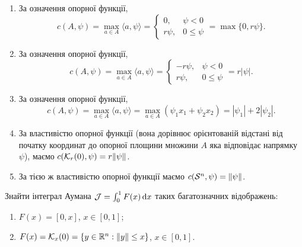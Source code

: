 \begin{solution}
	\begin{enumerate}
		\item За означення опорної функції, \[ c(A, \psi) = \max_{a \in A} \langle a, \psi \rangle = \begin{cases} 0, & \psi < 0 \\ r \psi, & 0 \le \psi \end{cases} = \max \{ 0, r \psi \}. \]

		\item За означення опорної функції, \[ c(A, \psi) = \max_{a \in A} \langle a, \psi \rangle = \begin{cases} - r \psi, & \psi < 0 \\ r \psi, & 0 \le \psi \end{cases} = r |\psi |. \]

		\item За означення опорної функції, \[ c(A, \psi) = \max_{a \in A} \langle a, \psi \rangle = \max_{a \in A} (\psi_1 x_1 + \psi_2 x_2) = |\psi_1| + 2 |\psi_2|. \]

		\item За властивістю опорної функції (вона дорівнює орієнтованій відстані від початку координат до опорної площини множини $A$ яка відповідає напрямку $\psi$), маємо $c(\mathcal{K}_r (0), \psi) = r \| \psi \|$.

		\item За тією ж властивістю опорної функції маємо $c(\mathcal{S}^n, \psi) = \| \psi \|$.
	\end{enumerate}
\end{solution}

\begin{problem}
	Знайти інтеграл Аумана $\mathcal{J} = \int_0^1 F(x) \mathop{}\!\mathrm{d} x$ таких багатозначних відображень:

	\begin{enumerate}
		\item $F(x) = [0, x]$, $x \in [0, 1]$;

		\item $F(x) = \mathcal{K}_x (0) = \{ y \in \mathbb{R}^n: \|y\| \le x \}$, $x \in [0, 1]$.
	\end{enumerate}
\end{problem}


